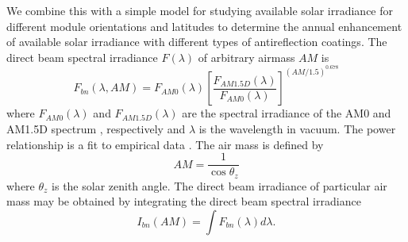 \documentclass[preprint,12pt]{elsarticle}
\begin{document}
We combine this with a simple model for studying available solar irradiance for different module orientations and latitudes
\cite{Sharma:21} to determine the annual enhancement of available solar irradiance with different types of antireflection coatings.  
The direct beam spectral irradiance $F(\lambda)$ of arbitrary airmass $AM$ is 
\begin{equation}
F_{bn} (\lambda, AM) = F_{AM0} (\lambda) \left [ \frac{F_{AM1.5D} (\lambda)}{F_{AM0} (\lambda)}  \right ] ^{ \left ( AM/1.5 \right )^{0.678}}
\end{equation}
where $F_{AM0}(\lambda)$
and $F_{AM1.5D}(\lambda)$ are 
the spectral irradiance of the AM0 and AM1.5D spectrum \cite{AM1p5}, respectively and $\lambda$ is the wavelength in vacuum. 
The power relationship is a  fit to empirical data \cite{Meinel:76}.
The air mass is defined by
\begin{equation}
AM = \frac{1}{\cos \theta_z}
\end{equation}
where $\theta_z$ is the solar zenith angle.  
The direct beam irradiance of particular air mass may be obtained by integrating the direct beam spectral irradiance
\begin{equation}
I_{bn} (AM) = \int F_{bn} (\lambda) d \lambda
\label{eq:IAMDb}.
\end{equation}
\end{document}
